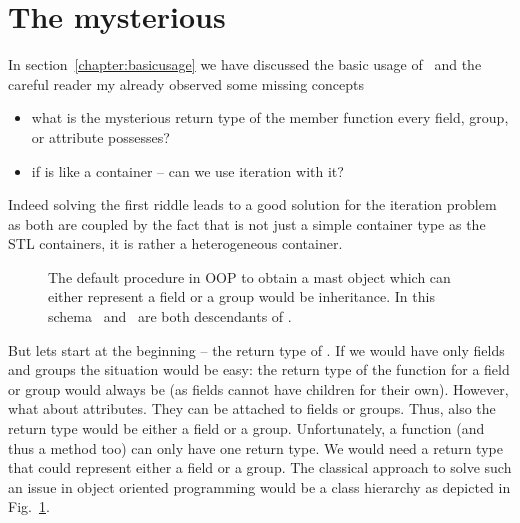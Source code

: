 \section{The mysterious \nxobject}\label{section:nxobject}

In section~\ref{chapter:basicusage} we have discussed the basic usage of
\libpniio\ and the careful reader my already observed some missing concepts
\begin{itemize}
\item what is the mysterious return type of the  member function
every field, group, or attribute possesses?
\item if  is like a container -- can we use iteration with it?
\end{itemize}
Indeed solving the first riddle leads to a good solution for the iteration
problem as both are coupled by the fact that  is not just a simple
container type as the STL containers, it is rather a heterogeneous container. 

\begin{figure}
    \centering
    \caption{{\small\label{fig:advanced:hierarchy}
    The default procedure in OOP to obtain a mast object which can either represent a
    field or a group would be inheritance. In this schema \nxfield\ and
    \nxgroup\ are both descendants of \nxobject. 
    }}
\end{figure}

But lets start at the beginning -- the return type of . If we
would have only fields and groups the situation would be easy: the return type
of the  function for a field or group would always be
 (as fields cannot have children for their own). 
However, what about attributes. They can be attached to fields or groups. Thus,
also the return type would be either a field or a group. Unfortunately, a
function (and thus a method too) can only have one return type. We would need a
return type that could represent either a field or a group. 
The classical approach to solve such an issue in object oriented programming
would be a class hierarchy as depicted in Fig.~\ref{fig:advanced:hierarchy}.

